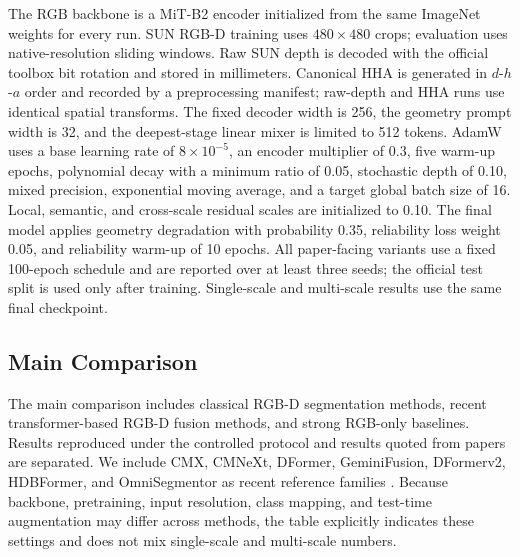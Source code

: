 \documentclass[a4paper,fleqn]{cas-dc}
\begin{document}
The RGB backbone is a MiT-B2 encoder initialized from the same ImageNet weights for every run. SUN RGB-D training uses $480\times480$ crops; evaluation uses native-resolution sliding windows. Raw SUN depth is decoded with the official toolbox bit rotation and stored in millimeters. Canonical HHA is generated in $d$-$h$-$a$ order and recorded by a preprocessing manifest; raw-depth and HHA runs use identical spatial transforms. The fixed decoder width is 256, the geometry prompt width is 32, and the deepest-stage linear mixer is limited to 512 tokens. AdamW uses a base learning rate of $8\times10^{-5}$, an encoder multiplier of 0.3, five warm-up epochs, polynomial decay with a minimum ratio of 0.05, stochastic depth of 0.10, mixed precision, exponential moving average, and a target global batch size of 16. Local, semantic, and cross-scale residual scales are initialized to 0.10. The final model applies geometry degradation with probability 0.35, reliability loss weight 0.05, and reliability warm-up of 10 epochs. All paper-facing variants use a fixed 100-epoch schedule and are reported over at least three seeds; the official test split is used only after training. Single-scale and multi-scale results use the same final checkpoint.

\subsection{Main Comparison}

The main comparison includes classical RGB-D segmentation methods, recent transformer-based RGB-D fusion methods, and strong RGB-only baselines. Results reproduced under the controlled protocol and results quoted from papers are separated. We include CMX, CMNeXt, DFormer, GeminiFusion, DFormerv2, HDBFormer, and OmniSegmentor as recent reference families \citep{zhang2023cmx,zhang2023delivering,yin2024dformer,ding2024geminifusion,yin2025dformerv2,wei2025hdbformer,yin2025omnisegmentor}. Because backbone, pretraining, input resolution, class mapping, and test-time augmentation may differ across methods, the table explicitly indicates these settings and does not mix single-scale and multi-scale numbers.
\end{document}
